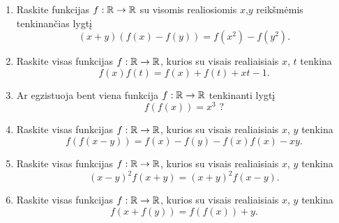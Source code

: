 \begin{enumerate}
  \item {} Raskite funkcijas $f:\mathbb R\to\mathbb R$ su visomis realiosiomis
    $x$,$y$ reikšmėmis tenkinančias lygtį
    $$(x+y)(f(x)-f(y))=f(x^2)-f(y^2).$$
  \item Raskite visas funkcijas $f:\mathbb R\to\mathbb R$, kurios su visais realiaisiais
    $x$, $t$ tenkina $$f(x)f(t) = f(x) + f(t) + xt -1.$$
  \item \text{[LitMo 1994]} Ar egzistuoja bent viena funkcija $f:\mathbb R \to \mathbb R$
    tenkinanti lygtį $$f(f(x))=x^3 \text{ ?}$$
  \item Raskite visas funkcijas $f:\mathbb R\to\mathbb R$, kurios su visais realiaisiais
    $x$, $y$ tenkina $$f(f(x-y)) = f(x) - f(y) - f(x)f(x) - xy.$$
  \item Raskite visas funkcijas $f:\mathbb R\to\mathbb R$, kurios su visais realiaisiais
    $x$, $y$ tenkina $$(x-y)^2f(x+y)=(x+y)^2f(x-y).$$
    \item Raskite visas funkcijas $f:\mathbb R\to\mathbb R$, kurios su visais realiaisiais
    $x$, $y$ tenkina $$f(x+f(y))=f(f(x))+y.$$

\end{enumerate}

